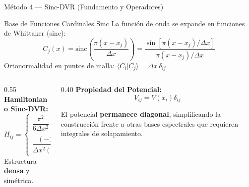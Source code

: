 \documentclass[aspectratio=169,10pt]{beamer}
\begin{document}
\begin{frame}{Método 4 — Sinc-DVR (Fundamento y Operadores)}

\begin{physbox}{Base de Funciones Cardinales Sinc}
La función de onda se expande en funciones de Whittaker (sinc):
\[
  C_j(x) = \text{sinc}\!\left(\frac{\pi(x-x_j)}{\Delta x}\right) = \frac{\sin[\pi(x-x_j)/\Delta x]}{\pi(x-x_j)/\Delta x}
\]
Ortonormalidad en puntos de malla: $\langle C_i|C_j\rangle = \Delta x\,\delta_{ij}$
\end{physbox}

\vspace{0.4cm}

\begin{columns}[T]

  \begin{column}{0.55\textwidth}
    \textbf{Hamiltoniano Sinc-DVR:}
    \small
    \[
      H_{ij} = \begin{cases}
        \dfrac{\pi^2}{6\Delta x^2} + V(x_i) & i=j\\[10pt]
        \dfrac{(-1)^{i-j}}{\Delta x^2(i-j)^2} & i\ne j
      \end{cases}
    \]
    \footnotesize
    Estructura \textbf{densa} y simétrica.
  \end{column}

  \begin{column}{0.40\textwidth}
    \vspace{0.2cm}
    \textbf{Propiedad del Potencial:}
    \[ V_{ij}=V(x_i)\delta_{ij} \]
    
    \vspace{0.2cm}
    \footnotesize
    El potencial \textbf{permanece diagonal}, simplificando la construcción frente a otras bases espectrales que requieren integrales de solapamiento.
  \end{column}

\end{columns}

\end{frame}
\end{document}
